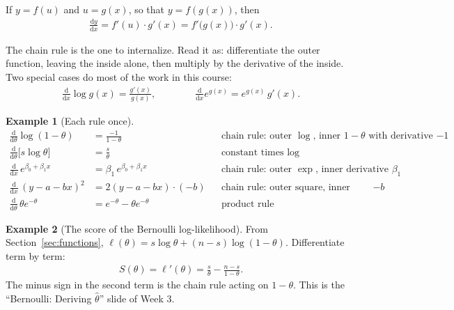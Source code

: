 \documentclass[11pt]{article}
\theoremstyle{definition}
\newtheorem{example}{Example}[section]
\newcommand{\loglik}{\ell}
\newcommand{\dd}{\mathrm{d}}
\begin{document}
\begin{rulebox}
If $y = f(u)$ and $u = g(x)$, so that $y = f(g(x))$, then
\begin{align*}
  \frac{\dd y}{\dd x} = f'(u)\cdot g'(x) = f'\big(g(x)\big)\cdot g'(x).
\end{align*}
\end{rulebox}

The chain rule is the one to internalize. Read it as: differentiate the
outer function, leaving the inside alone, then multiply by the derivative
of the inside. Two special cases do most of the work in this course:
\begin{align*}
  \frac{\dd}{\dd x}\log g(x) = \frac{g'(x)}{g(x)},
  \qquad\qquad
  \frac{\dd}{\dd x}e^{g(x)} = e^{g(x)}\, g'(x).
\end{align*}

\begin{example}[Each rule once]
\begin{align*}
  \frac{\dd}{\dd\theta}\log(1-\theta) &= \frac{-1}{1-\theta}
    && \text{chain rule: outer $\log$, inner $1-\theta$ with derivative $-1$} \\
  \frac{\dd}{\dd\theta}\big[s\log\theta\big] &= \frac{s}{\theta}
    && \text{constant times $\log$} \\
  \frac{\dd}{\dd x}\, e^{\beta_0 + \beta_1 x} &= \beta_1\, e^{\beta_0 + \beta_1 x}
    && \text{chain rule: outer $\exp$, inner derivative $\beta_1$} \\
  \frac{\dd}{\dd x}\,(y - a - bx)^2 &= 2(y - a - bx)\cdot(-b)
    && \text{chain rule: outer square, inner derivative $-b$} \\
  \frac{\dd}{\dd\theta}\, \theta e^{-\theta} &= e^{-\theta} - \theta e^{-\theta}
    && \text{product rule}
\end{align*}
\end{example}

\begin{example}[The score of the Bernoulli log-likelihood]
From Section~\ref{sec:functions},
$\loglik(\theta) = s\log\theta + (n-s)\log(1-\theta)$. Differentiate term
by term:
\begin{align*}
  S(\theta) = \loglik'(\theta) = \frac{s}{\theta} - \frac{n-s}{1-\theta}.
\end{align*}
The minus sign in the second term is the chain rule acting on $1-\theta$.
This is the ``Bernoulli: Deriving $\hat\theta$'' slide of Week 3.
\end{example}
\end{document}

